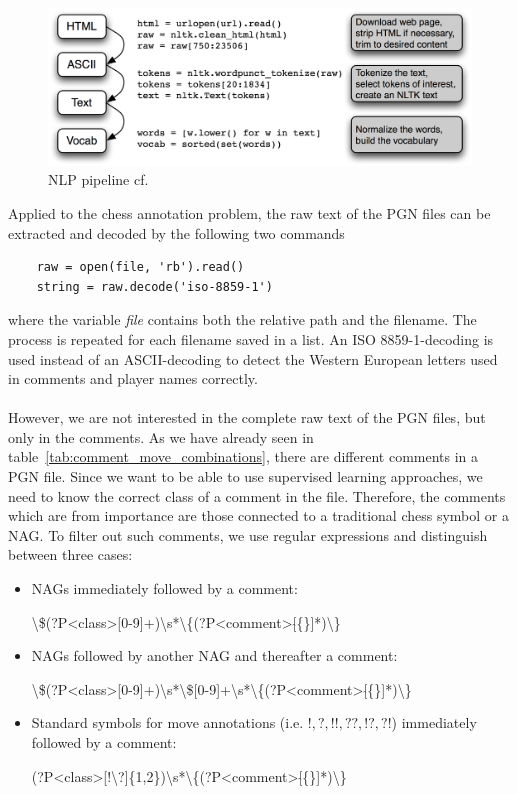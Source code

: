 \documentclass[article,type=msc,colorback,accentcolor=tud7b]{tudthesis}
\begin{document}
    \begin{figure}[H]
      \centering
      \includegraphics{images/nlp_pipeline}
      \caption[NLP pipeline]{NLP pipeline cf.\autocite[Section~3.1]{Bird2009}}
      \label{fig:nlp_pipeline}
    \end{figure}
    
    Applied to the chess annotation problem, the raw text of the PGN files can be extracted and decoded by the following two commands    
    \begin{lstlisting}
    raw = open(file, 'rb').read()
    string = raw.decode('iso-8859-1')
    \end{lstlisting}  
    where the variable \textit{file} contains both the relative path and the filename. The process is repeated for each filename saved in a list. An ISO 8859-1-decoding is used instead of an ASCII-decoding to detect the Western European letters used in comments and player names correctly. \\\\
    However, we are not interested in the complete raw text of the PGN files, but only in the comments. As we have already seen in table~\ref{tab:comment_move_combinations}, there are different comments in a PGN file. Since we want to be able to use supervised learning approaches, we need to know the correct class of a comment in the file. Therefore, the comments which are from importance are those connected to a traditional chess symbol or a NAG. To filter out such comments, we use regular expressions and distinguish between three cases:
    \begin{itemize}
      \item NAGs immediately followed by a comment:

        \textbackslash\$(?P<class>[0-9]+)\textbackslash s*\textbackslash\{(?P<comment>[$\hat{}$\{\}]*)\textbackslash\}
      \item NAGs followed by another NAG and thereafter a comment:

        \textbackslash\$(?P<class>[0-9]+)\textbackslash s*\textbackslash\$[0-9]+\textbackslash s*\textbackslash\{(?P<comment>[$\hat{}$\{\}]*)\textbackslash\}
      \item Standard symbols for move annotations (i.e. $!,?,!!,??,!?,?!$) immediately followed by a comment:

        (?P<class>[!\textbackslash?]\{1,2\})\textbackslash s*\textbackslash\{(?P<comment>[$\hat{}$\{\}]*)\textbackslash\}
    \end{itemize}
\end{document}
